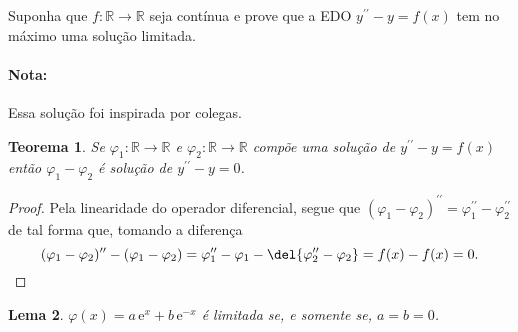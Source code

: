 \documentclass{IMTexam}
\author{Isabella B. Amaral}
\date{10 de Agosto}
\newtheorem{theorem}{Teorema}[question]
\newtheorem{lemma}[theorem]{Lema}
\begin{document}
    \maketitle

    \begin{questions}
        \question Suponha que $f\colon\mathbb{R}\longrightarrow\mathbb{R}$ seja
        contínua e prove que a EDO $y^{\prime\prime}-y=f(x)$ tem no máximo uma solução
        limitada.

        \begin{solution}
            \paragraph{Nota:} Essa solução foi inspirada por colegas.

            \begin{theorem}\label{thm:difSolution}
                Se $ \varphi_1\colon\mathbb{R}\longrightarrow\mathbb{R}$ e
                $\varphi_2\colon\mathbb{R}\longrightarrow\mathbb{R}$ compõe uma solução de
                $y^{\prime\prime}-y=f(x)$ então $\varphi_1-\varphi_2$ é solução de
                $y^{\prime\prime} - y = 0$.
            \end{theorem}

            \begin{proof}
                Pela linearidade do operador diferencial, segue que
                $(\varphi_1-\varphi_2)^{\prime\prime} =
                \varphi_1^{\prime\prime}-\varphi_2^{\prime\prime}$ de tal forma
                que, tomando a diferença
                \[ (\varphi_1-\varphi_2)^{\prime\prime}-(\varphi_1-\varphi_2)
                =\varphi_1^{\prime\prime}-\varphi_1-\del{\varphi_2^{\prime\prime}-\varphi_2}
                = f(x) - f(x)=0. \]
            \end{proof}

            \begin{lemma}\label{lem:difLimit}
                $\varphi(x) = a\,\mathrm{e}^x+b\,\mathrm{e}^{-x}$ é limitada
                se, e somente se, $a=b=0$.
            \end{lemma}


\end{solution}
\end{questions}
\end{document}
